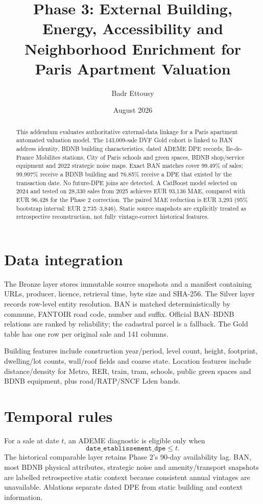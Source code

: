 \documentclass[11pt,a4paper]{article}
\title{Phase 3: External Building, Energy, Accessibility and\\
Neighborhood Enrichment for Paris Apartment Valuation}
\author{Badr Ettousy}
\date{August 2026}
\begin{document}
\maketitle

\begin{abstract}
This addendum evaluates authoritative external-data linkage for a Paris
apartment automated valuation model. The 143,009-sale DVF Gold cohort is linked
to BAN address identity, BDNB building characteristics, dated ADEME DPE records,
Ile-de-France Mobilites stations, City of Paris schools and green spaces, BDNB
shop/service equipment and 2022 strategic noise maps. Exact BAN matches cover
99.49\% of sales; 99.997\% receive a BDNB building and 76.85\% receive a DPE
that existed by the transaction date. No future-DPE joins are detected. A
CatBoost model selected on 2024 and tested on 28,330 sales from 2025 achieves
EUR 93,136 MAE, compared with EUR 96,428 for the Phase 2 correction. The paired
MAE reduction is EUR 3,293 (95\% bootstrap interval: EUR 2,735--3,846).
Static source snapshots are explicitly treated as retrospective reconstruction,
not fully vintage-correct historical features.
\end{abstract}

\section{Data integration}
The Bronze layer stores immutable source snapshots and a manifest containing
URLs, producer, licence, retrieval time, byte size and SHA-256. The Silver
layer records row-level entity resolution. BAN is matched deterministically by
commune, FANTOIR road code, number and suffix. Official BAN--BDNB relations are
ranked by reliability; the cadastral parcel is a fallback. The Gold table has
one row per original sale and 141 columns.

Building features include construction year/period, level count, height,
footprint, dwelling/lot counts, wall/roof fields and coarse state. Location
features include distance/density for Metro, RER, train, tram, schools, public
green spaces and BDNB equipment, plus road/RATP/SNCF Lden bands.

\section{Temporal rules}
For a sale at date $t$, an ADEME diagnostic is eligible only when
\[
  \texttt{date\_etablissement\_dpe} \leq t.
\]
The historical comparable layer retains Phase 2's 90-day availability lag.
BAN, most BDNB physical attributes, strategic noise and amenity/transport
snapshots are labelled retrospective static context because consistent annual
vintages are unavailable. Ablations separate dated DPE from static building and
context information.
\end{document}
